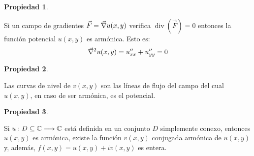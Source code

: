 \documentclass[a5paper,12pt,twoside]{book}
\newtheorem{prop}{{Propiedad}}[chapter]
\begin{document}
\begin{mdframed}[style=PropertyFrame]
    \begin{prop}
    \end{prop}
    Si un campo de gradientes $\Vec{F}=\Vec{\nabla} u(x,y)$ verifica $\operatorname{div}(\Vec{F})=0$ entonces la función potencial $u(x,y)$ es armónica.
    Esto es:
    \begin{equation*}
        \Vec{\nabla}^2 u(x,y) = u_{xx}'' + u_{yy}'' = 0
    \end{equation*}
\end{mdframed}

\begin{mdframed}[style=PropertyFrame]
    \begin{prop}
    \end{prop}
    Las curvas de nivel de $v(x,y)$ son las líneas de flujo del campo del cual $u(x,y)$, en caso de ser armónica, es el potencial.
\end{mdframed}

\begin{mdframed}[style=PropertyFrame]
    \begin{prop}
    \end{prop}
    Si $u: D \subseteq \mathbb{C} \longrightarrow \mathbb{C}$ está definida en un conjunto $D$ simplemente conexo, entonces $u(x,y)$ es armónica, existe la función $v(x,y)$ conjugada armónica de $u(x,y)$ y, además, $f(x,y)=u(x,y)+iv(x,y)$ es entera.
\end{mdframed}

\end{document}
